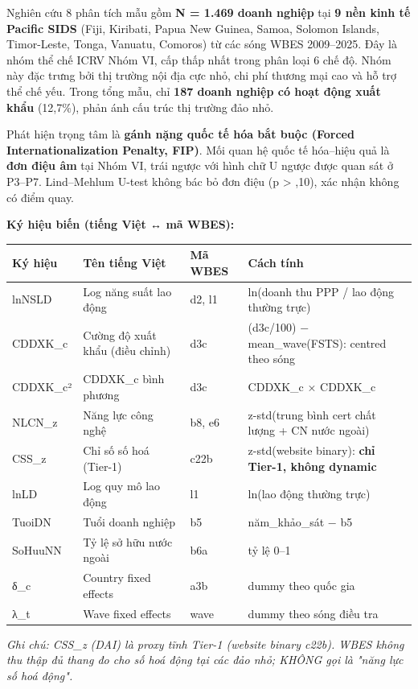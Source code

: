 \documentclass[12pt,a4paper]{article}
\begin{document}
Nghiên cứu 8 phân tích mẫu gồm \textbf{N = 1.469 doanh nghiệp} tại
\textbf{9 nền kinh tế Pacific SIDS} (Fiji, Kiribati, Papua New Guinea,
Samoa, Solomon Islands, Timor-Leste, Tonga, Vanuatu, Comoros) từ các
sóng WBES 2009--2025. Đây là nhóm thể chế ICRV Nhóm VI, cấp thấp nhất
trong phân loại 6 chế độ. Nhóm này đặc trưng bởi thị trường nội địa cực
nhỏ, chi phí thương mại cao và hỗ trợ thể chế yếu. Trong tổng mẫu, chỉ
\textbf{187 doanh nghiệp có hoạt động xuất khẩu} (12,7\%), phản ánh cấu
trúc thị trường đảo nhỏ.

Phát hiện trọng tâm là \textbf{gánh nặng quốc tế hóa bắt buộc (Forced
Internationalization Penalty, FIP)}. Mối quan hệ quốc tế hóa--hiệu quả
là \textbf{đơn điệu âm} tại Nhóm VI, trái ngược với hình chữ U ngược
được quan sát ở P3--P7. Lind--Mehlum U-test không bác bỏ đơn điệu (p
\textgreater{} ,10), xác nhận không có điểm quay.

\textbf{Ký hiệu biến (tiếng Việt ↔ mã WBES):}

\begin{longtable}[]{@{}llll@{}}
\toprule\noalign{}
Ký hiệu & Tên tiếng Việt & Mã WBES & Cách tính \\
\midrule\noalign{}
\endhead
\bottomrule\noalign{}
\endlastfoot
lnNSLD & Log năng suất lao động & d2, l1 & ln(doanh thu PPP / lao động
thường trực) \\
CDDXK\_c & Cường độ xuất khẩu (điều chỉnh) & d3c & (d3c/100) −
mean\_wave(FSTS): centred theo sóng \\
CDDXK\_c² & CDDXK\_c bình phương & d3c & CDDXK\_c × CDDXK\_c \\
NLCN\_z & Năng lực công nghệ & b8, e6 & z-std(trung bình cert chất lượng
+ CN nước ngoài) \\
CSS\_z & Chỉ số số hoá (Tier-1) & c22b & z-std(website binary):
\textbf{chỉ Tier-1, không dynamic} \\
lnLD & Log quy mô lao động & l1 & ln(lao động thường trực) \\
TuoiDN & Tuổi doanh nghiệp & b5 & năm\_khảo\_sát − b5 \\
SoHuuNN & Tỷ lệ sở hữu nước ngoài & b6a & tỷ lệ 0--1 \\
δ\_c & Country fixed effects & a3b & dummy theo quốc gia \\
λ\_t & Wave fixed effects & wave & dummy theo sóng điều tra \\
\end{longtable}

\emph{Ghi chú: CSS\_z (DAI) là proxy tĩnh Tier-1 (website binary c22b).
WBES không thu thập đủ thang đo cho số hoá động tại các đảo nhỏ; KHÔNG
gọi là "năng lực số hoá động".}
\end{document}

